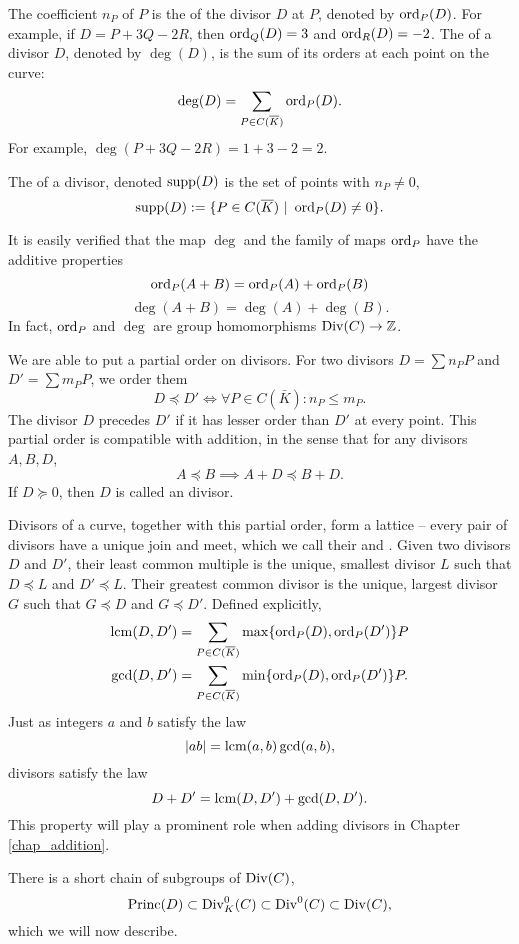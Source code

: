 The coefficient $n_P$ of $P$ is the  of the divisor $D$ at $P$, denoted by $\operatorname{ord}_P(D)$.
For example, if $D = P + 3Q - 2R$, then $\operatorname{ord}_Q(D) = 3$ and $\operatorname{ord}_R(D) = -2$.
The  of a divisor $D$, denoted by $\deg(D)$, is the sum of its orders at each point on the curve:
  \[ \deg(D) = \sum_{P \in C(\overline K)} \operatorname{ord}_P(D). \]
For example, $\deg(P + 3Q - 2R) = 1 + 3 - 2 = 2$.

The  of a divisor, denoted $\operatorname{supp}(D)$ is the set of points with $n_P \neq 0$,
\[ \operatorname{supp}(D) := \{ P \in C(\overline K) ~|~ \operatorname{ord}_P(D) \neq 0 \}. \]

It is easily verified that the map $\deg$ and the family of maps $\operatorname{ord}_P$ have the additive properties
  \[ \operatorname{ord}_P(A + B) = \operatorname{ord}_P(A) + \operatorname{ord}_P(B) \]
  \[ \deg(A + B) = \deg(A) + \deg(B). \]
In fact, $\operatorname{ord}_P$ and $\deg$ are group homomorphisms $\operatorname{Div}(C) \to \mathbb{Z}$.

We are able to put a partial order on divisors.
For two divisors $D = \sum n_P P$ and $D' = \sum m_P P$,
we order them
  \[ D \preceq D' \iff \forall P \in C(\bar K) : n_P \leq m_P. \]
The divisor $D$ precedes $D'$ if it has lesser order than $D'$ at every point.
This partial order is compatible with addition, in the sense that for any divisors $A, B, D$,
  \[ A \preceq B \implies A + D \preceq B + D. \]
If $D \succeq 0$, then $D$ is called an  divisor.

Divisors of a curve, together with this partial order, form a lattice --
every pair of divisors have a unique join and meet,
which we call their  and .
Given two divisors $D$ and $D'$, their least common multiple is the unique, smallest divisor $L$
such that $D \preceq L$ and $D' \preceq L$.
Their greatest common divisor is the unique, largest divisor $G$ such that $G \preceq D$ and $G \preceq D'$.
Defined explicitly,
\begin{align*}
  \operatorname{lcm}(D, D') &= \sum_{P \in C(\overline K)}\max\{\operatorname{ord}_P(D), \operatorname{ord}_P(D')\}P \\
  \gcd(D, D') &= \sum_{P \in C(\overline K)}\min\{\operatorname{ord}_P(D), \operatorname{ord}_P(D')\}P.
\end{align*}
Just as integers $a$ and $b$ satisfy the law
  \[ \left| ab \right| = \operatorname{lcm}(a,b)\gcd(a,b), \]
divisors satisfy the law
  \[ D + D' = \operatorname{lcm}(D, D') + \gcd(D, D'). \]
This property will play a prominent role when adding divisors in Chapter \ref{chap_addition}.

There is a short chain of subgroups of $\operatorname{Div}(C)$,
\[ \operatorname{Princ}(D) \subset \operatorname{Div}_K^0(C) \subset \operatorname{Div}^0(C) \subset \operatorname{Div}(C), \]
which we will now describe.

